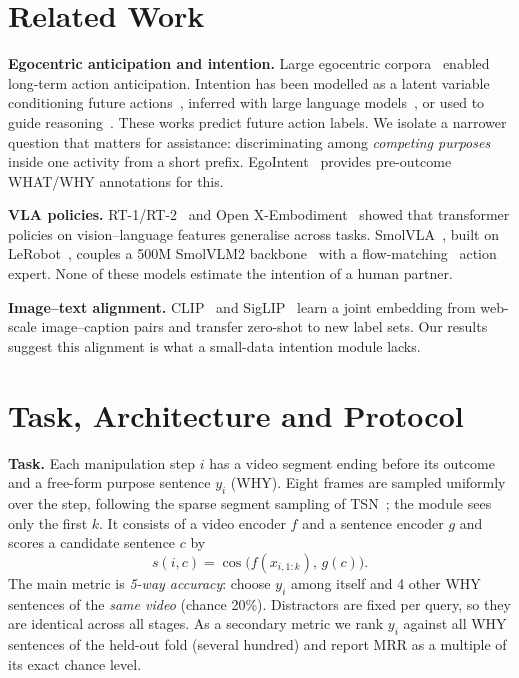 \documentclass[conference,a4paper]{IEEEtran}
\begin{document}
\section{Related Work}

\textbf{Egocentric anticipation and intention.} Large egocentric corpora~\cite{grauman2022ego4d,grauman2024egoexo4d} enabled long-term action anticipation. Intention has been modelled as a latent variable conditioning future actions~\cite{mascaro2023intention}, inferred with large language models~\cite{zhao2024antgpt}, or used to guide reasoning~\cite{chu2026insight}. These works predict future action labels. We isolate a narrower question that matters for assistance: discriminating among \emph{competing purposes} inside one activity from a short prefix. EgoIntent~\cite{egointent2026} provides pre-outcome WHAT/WHY annotations for this.

\textbf{VLA policies.} RT-1/RT-2~\cite{brohan2022rt1,zitkovich2023rt2} and Open X-Embodiment~\cite{openx2024} showed that transformer policies on vision--language features generalise across tasks. SmolVLA~\cite{shukor2025smolvla}, built on LeRobot~\cite{cadene2026lerobot}, couples a 500M SmolVLM2 backbone~\cite{marafioti2025smolvlm} with a flow-matching~\cite{lipman2023flow} action expert. None of these models estimate the intention of a human partner.

\textbf{Image--text alignment.} CLIP~\cite{radford2021clip} and SigLIP~\cite{zhai2023siglip} learn a joint embedding from web-scale image--caption pairs and transfer zero-shot to new label sets. Our results suggest this alignment is what a small-data intention module lacks.

\section{Task, Architecture and Protocol}

\textbf{Task.} Each manipulation step $i$ has a video segment ending before its outcome and a free-form purpose sentence $y_i$ (WHY). Eight frames are sampled uniformly over the step, following the sparse segment sampling of TSN~\cite{wang2016tsn}; the module sees only the first $k$. It consists of a video encoder $f$ and a sentence encoder $g$ and scores a candidate sentence $c$ by
\begin{equation}
s(i,c)=\cos\!\big(f(x_{i,1:k}),\,g(c)\big).
\end{equation}
The main metric is \emph{5-way accuracy}: choose $y_i$ among itself and 4 other WHY sentences of the \emph{same video} (chance 20\%). Distractors are fixed per query, so they are identical across all stages. As a secondary metric we rank $y_i$ against all WHY sentences of the held-out fold (several hundred) and report MRR as a multiple of its exact chance level.
\end{document}
